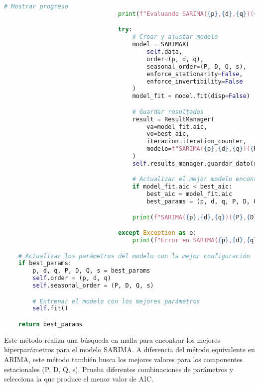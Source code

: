 \documentclass[12pt,letterpaper]{report}
\begin{document}
\begin{lstlisting}[language=python]
                                # Mostrar progreso
                                print(f"Evaluando SARIMA({p},{d},{q})({P},{D},{Q},{s})")

                                try:
                                    # Crear y ajustar modelo
                                    model = SARIMAX(
                                        self.data,
                                        order=(p, d, q),
                                        seasonal_order=(P, D, Q, s),
                                        enforce_stationarity=False,
                                        enforce_invertibility=False
                                    )
                                    model_fit = model.fit(disp=False)

                                    # Guardar resultados
                                    result = ResultManager(
                                        va=model_fit.aic,
                                        vo=best_aic,
                                        iteracion=iteration_counter,
                                        modelo=f"SARIMA({p},{d},{q})({P},{D},{Q},{s})"
                                    )
                                    self.results_manager.guardar_dato(result)

                                    # Actualizar el mejor modelo encontrado
                                    if model_fit.aic < best_aic:
                                        best_aic = model_fit.aic
                                        best_params = (p, d, q, P, D, Q, s)

                                    print(f"SARIMA({p},{d},{q})({P},{D},{Q},{s}) - AIC: {model_fit.aic}")

                                except Exception as e:
                                    print(f"Error en SARIMA({p},{d},{q})({P},{D},{Q},{s}): {str(e)}")

    # Actualizar los parámetros del modelo con la mejor configuración
    if best_params:
        p, d, q, P, D, Q, s = best_params
        self.order = (p, d, q)
        self.seasonal_order = (P, D, Q, s)

        # Entrenar el modelo con los mejores parámetros
        self.fit()

    return best_params
\end{lstlisting}

Este método realiza una búsqueda en malla para encontrar los mejores hiperparámetros para el modelo SARIMA. A diferencia del método equivalente en ARIMA, este método también busca los mejores valores para los componentes estacionales (P, D, Q, s). Prueba diferentes combinaciones de parámetros y selecciona la que produce el menor valor de AIC.
\end{document}
